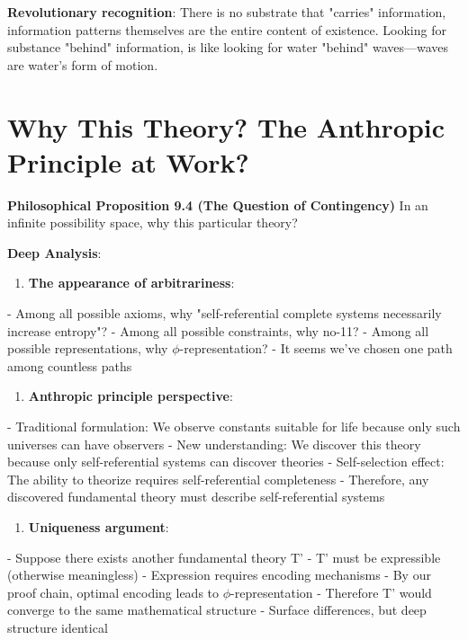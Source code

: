    \textbf{Revolutionary recognition}: There is no substrate that "carries" information,
   information patterns themselves are the entire content of existence.
   Looking for substance "behind" information,
   is like looking for water "behind" waves---waves are water's form of motion.

\section{Why This Theory? The Anthropic Principle at Work?}
\label{sec:ch09_philosophy:why-this-theory-the-anthropic-principle-at-work}

\textbf{Philosophical Proposition 9.4 (The Question of Contingency)}
In an infinite possibility space, why this particular theory?

\textbf{Deep Analysis}:

\begin{enumerate}
\item \textbf{The appearance of arbitrariness}:
\end{enumerate}
   - Among all possible axioms, why "self-referential complete systems necessarily increase entropy"?
   - Among all possible constraints, why no-11?
   - Among all possible representations, why $\phi$-representation?
   - It seems we've chosen one path among countless paths

\begin{enumerate}
\item \textbf{Anthropic principle perspective}:
\end{enumerate}
   - Traditional formulation: We observe constants suitable for life because only such universes can have observers
   - New understanding: We discover this theory because only self-referential systems can discover theories
   - Self-selection effect: The ability to theorize requires self-referential completeness
   - Therefore, any discovered fundamental theory must describe self-referential systems

\begin{enumerate}
\item \textbf{Uniqueness argument}:
\end{enumerate}
   - Suppose there exists another fundamental theory T'
   - T' must be expressible (otherwise meaningless)
   - Expression requires encoding mechanisms
   - By our proof chain, optimal encoding leads to $\phi$-representation
   - Therefore T' would converge to the same mathematical structure
   - Surface differences, but deep structure identical

